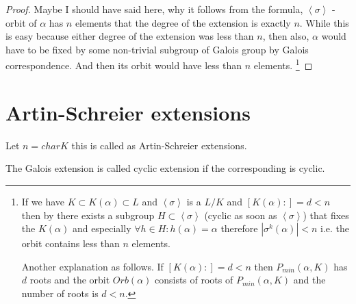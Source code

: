 \begin{proposition}
\begin{proof}
    Maybe I should have said here, why it follows from the formula,
    $\left<\sigma\right>$ - orbit of $\alpha$ has $n$ elements
    that the degree of the extension is exactly $n$. While this is
    easy because either degree of the extension was less than $n$,
    then also, $\alpha$ would have to be fixed by some non-trivial
    subgroup of Galois group by Galois correspondence. And then its
    orbit would have less than $n$ elements.
    \footnote{
      If we have $K \subset K\left(\alpha\right) \subset L$ and
      $\left<\sigma\right>$ is a  $L/K$ and
      $\left[K\left(\alpha\right):\right] = d < n$ then by
       there exists a subgroup
      $H \subset \left<\sigma\right>$
      (cyclic as soon as  $\left<\sigma\right>$) that fixes the
      $K\left(\alpha\right)$ and especially $\forall h \in H:
      h\left(\alpha\right) = \alpha$
      therefore
      $\left|\sigma^k\left(\alpha\right)\right| < n$ i.e. the orbit
      contains less than $n$ elements.

      Another explanation as follows. If
      $\left[K\left(\alpha\right):\right] = d < n$ then
      $P_{min}\left(\alpha, K\right)$ has $d$ roots and the orbit
      $Orb\left(\alpha\right)$ consists of roots of
      $P_{min}\left(\alpha, K\right)$ and the number of roots is
      $d < n$.
    }
  \end{proof}
  \label{prop:lec7_2}
\end{proposition}
  
\section{Artin-Schreier extensions}
Let $n = char K$ this is called as Artin-Schreier extensions.

\begin{definition}
  The Galois extension is called cyclic extension if the corresponding
   is cyclic.
  \label{def:cyclicextension}
\end{definition}

